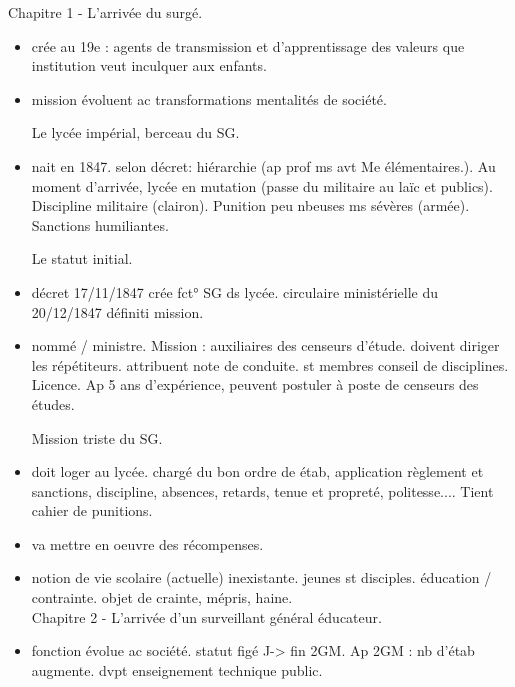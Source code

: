 \documentclass[12pt]{article}
\begin{document}
Chapitre 1 - L'arrivée du surgé.
\begin{itemize}
\item crée au 19e : agents de transmission et d'apprentissage des valeurs que institution veut inculquer aux enfants.\\
\item mission évoluent ac transformations mentalités de société.

Le lycée impérial, berceau du SG.
\item nait en 1847. selon décret: hiérarchie (ap prof ms avt Me élémentaires.). Au moment d'arrivée, lycée en mutation (passe du militaire au laïc et publics). Discipline militaire (clairon). Punition peu nbeuses ms sévères (armée). Sanctions humiliantes.


Le statut initial.
\item décret 17/11/1847 crée fct° SG ds lycée. circulaire ministérielle du 20/12/1847 définiti mission.
\item nommé / ministre. Mission : auxiliaires des censeurs d'étude. doivent diriger les répétiteurs. attribuent note de conduite. st membres conseil de disciplines. Licence. Ap 5 ans d'expérience, peuvent postuler à poste de censeurs des études.

Mission triste du SG.
\item doit loger au lycée. chargé du bon ordre de étab, application règlement et sanctions, discipline, absences, retards, tenue et propreté, politesse.... Tient cahier de punitions.
\item va mettre en oeuvre des récompenses.
\item notion de vie scolaire (actuelle) inexistante. jeunes st disciples. éducation / contrainte. objet de crainte, mépris, haine. \\

Chapitre 2 - L'arrivée d'un surveillant général éducateur. \\

\item fonction évolue ac société. statut figé J-> fin 2GM. Ap 2GM : nb d'étab augmente. dvpt enseignement technique public.


\end{itemize}
\end{document}
